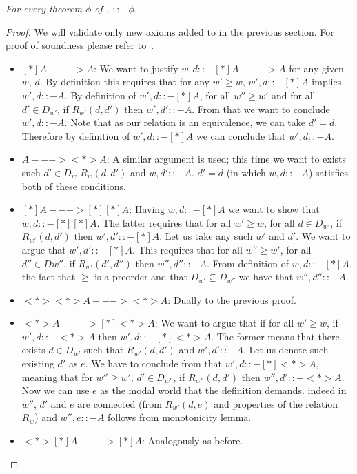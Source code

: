 \begin{theorem}[Soundness]\em
For every theorem $\phi$ of \logic , $ ::- \phi$.
\begin{proof}
We will validate only new axioms added to \logiciK{} in the previous section. For proof of \logiciK{} soundness please refer to~\cite{simpson}.
\begin{itemize}
\item $[*]A ---> A$: We want to justify $w, d ::- [*]A ---> A$ for any given $w$, $d$. By definition this requires that for any $w' \geq w$, $w', d ::- [*]A$ implies $w', d::- A$. By definition of $w', d ::- [*]A$, for all $w'' \geq w'$ and for all $d' \in D_{w'}$, if $R_{w'}(d, d')$ then $w', d' ::- A$. From that we want to conclude $w', d ::- A$. Note that as our relation is an equivalence, we can take $d' = d$. Therefore by definition of $w', d::- [*]A$ we can conclude that $w', d ::- A$.
\item $A ---> <*>A$: A similar argument is used; this time we want to exists such $d' \in D_w$ $R_w(d, d')$ and $w, d' ::- A$. $d'=d$ (in which $w, d ::- A$) satisfies both of these conditions.
\item $[*]A ---> [*][*]A$: Having $w, d ::- [*]A$ we want to show that $w, d ::- [*][*]A$. The latter requires that for all $w' \geq w$, for all $d \in D_{w'}$, if $R_{w'}(d, d')$  then $w', d' ::- [*]A$. Let us take any such $w'$ and $d'$. We want to argue that $w', d' ::- [*]A$. This requires that for all $w'' \geq w'$, for all $d'' \in D{w''}$, if $R_{w'}(d', d'')$ then $w'', d'' ::- A$.  From definition of $w, d ::- [*]A$, the fact that $\geq$ is a preorder and that $D_{w'} \subseteq D_{w''}$ we have that $w'', d'' ::- A$.
\item $<*><*>A ---> <*>A$: Dually to the previous proof.
\item $<*>A ---> [*]<*>A$: We want to argue that if for all $w' \geq w$, if $w', d ::- <*>A$ then $w', d ::- [*]<*>A$. The former means that there exists $d \in D_{w'}$ such that $R_{w'}(d, d')$ and $w', d' ::- A$. Let us denote such existing $d'$ as $e$. We have to conclude from that $w', d ::- [*]<*>A$, meaning that for $w'' \geq w'$, $d' \in D_{w''}$, if $R_{w''}(d, d')$ then $w'', d' ::- <*>A$. Now we can use $e$ as the modal world that the definition demands. indeed in $w''$, $d'$ and $e$ are connected (from $R_{w'}(d,e)$ and properties of the relation $R_w$) and $w'', e ::- A$ follows from monotonicity lemma.
\item $<*>[*]A ---> [*]A$: Analogously as before.
\end{itemize}
\end{proof}
\end{theorem}


